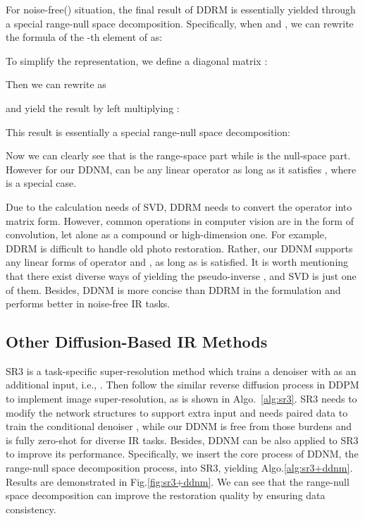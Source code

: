 \documentclass{article} \usepackage{iclr2023_conference,times}
\begin{document}
For noise-free() situation, the final result  of DDRM is essentially yielded through a special range-null space decomposition. Specifically,  when  and , we can rewrite the formula of the -th element of  as:

To simplify the representation, we define a diagonal matrix : 

Then we can rewrite  as

and yield the result  by left multiplying :

This result is essentially a special range-null space decomposition:

Now we can clearly see that  is the range-space part while  is the null-space part. However for our DDNM,  can be any linear operator as long as it satisfies , where  is a special case. 

Due to the calculation needs of SVD, DDRM needs to convert the operator  into matrix form. However, common operations in computer vision are in the form of convolution, let alone  as a compound or high-dimension one. For example, DDRM is difficult to handle old photo restoration. Rather, our DDNM supports any linear forms of operator  and , as long as  is satisfied. It is worth mentioning that there exist diverse ways of yielding the pseudo-inverse , and SVD is just one of them. Besides, DDNM is more concise than DDRM in the formulation and performs better in noise-free IR tasks. 


\subsection{Other Diffusion-Based IR Methods}
SR3 \citep{sr3} is a task-specific super-resolution method which trains a denoiser with \textcolor{blue}{} as an additional input, i.e., . Then follow the similar reverse diffusion process in DDPM \citep{ho2020denoising} to implement image super-resolution, as is shown in Algo.~\ref{alg:sr3}. SR3 needs to modify the network structures to support extra input  and needs paired data to train the conditional denoiser , while our DDNM is free from those burdens and is fully zero-shot for diverse IR tasks. Besides, DDNM can be also applied to SR3 to improve its performance. Specifically, we insert the core process of DDNM, the range-null space decomposition process, into SR3, yielding Algo.\ref{alg:sr3+ddnm}. Results are demonstrated in Fig.\ref{fig:sr3+ddnm}. We can see that the range-null space decomposition can improve the restoration quality by ensuring data consistency.
\end{document}
